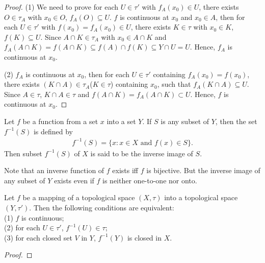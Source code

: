 \begin{proof}
    (1) We need to prove for each $U\in \tau'$ with $f_A(x_0)\in U$, there exists $O\in \tau_A$ with $x_0\in O$, $f_A(O)\subseteq U$.
    $f$ is continuous at $x_0$ and $x_0\in A$, then for each $U\in \tau'$ with $f(x_0)=f_A(x_0)\in U$, there exists $K\in \tau$ with $x_0\in K$, $f(K)\subseteq U$.
    Since $A\cap K\in \tau_A$ with $x_0\in A\cap K$ and $f_A(A\cap K) = f(A\cap K)\subseteq f(A)\cap f(K)\subseteq Y\cap U= U$. Hence, $f_A$ is continuous at $x_0$.
    \par
    (2) $f_A$ is continuous at $x_0$, then for each $U\in\tau'$ containing $f_A(x_0)=f(x_0)$, there exists $(K\cap A)\in \tau_A$($K\in\tau$) containing $x_0$, 
    such that $f_A(K\cap A)\subseteq U$. Since $A\in \tau$, $K\cap A\in \tau$ and $f(A\cap K)=f_A(A\cap K)\subset U$. Hence, $f$ is continuous at $x_0$. 
\end{proof}


\begin{definition}{}{}
    Let $f$ be a function from a set $x$ into a set $Y$. If $S$ is any subset of $Y$, 
    then the set $f^{-1}(S)$ is defined by
    \begin{align*}
        f^{-1}(S) = \{x:x\in X \text{ and } f(x)\in S\}.
    \end{align*}
    Then subset $f^{-1}(S)$ of $X$ is said to be the inverse image of $S$.
\end{definition}
\begin{remark}
    Note that an inverse function of $f$ exists iff $f$ is bijective. 
    But the inverse image of any subset of $Y$ exists even if $f$ is neither one-to-one nor onto.
\end{remark}

\begin{proposition}{}{}
    Let $f$ be a mapping of a topological space $(X,\tau)$ into a topological space $(Y,\tau')$. Then the following conditions are equivalent:\\
    (1) $f$ is continuous;\\
    (2) for each $U\in\tau'$, $f^{-1}(U)\in \tau$;\\
    (3) for each closed set $V$ in $Y$, $f^{-1}(Y)$ is closed in $X$.
\end{proposition}

\begin{proof}
    
\end{proof}

